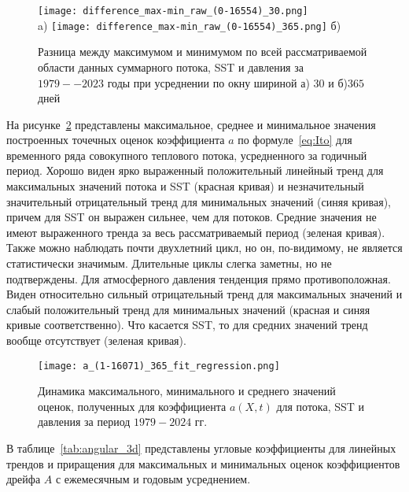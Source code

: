 \begin{figure}
	\centering
	\texttt{[image: difference\_max-min\_raw\_(0-16554)\_30.png]}\\
	a)
	\texttt{[image: difference\_max-min\_raw\_(0-16554)\_365.png]}
	б)
	\caption{Разница между максимумом и минимумом по всей рассматриваемой области данных суммарного потока, SST и давления за $1979--2023$ годы при усреднении по окну шириной а) $30$ и б)$365$ дней}
	\label{fig:raw_trends}
\end{figure}

На рисунке~\ref{fig:a_extreme_365} представлены максимальное, среднее и минимальное значения построенных точечных оценок коэффициента $a$ по формуле~\eqref{eq:Ito} для временного ряда совокупного теплового потока, усредненного за годичный период. Хорошо виден ярко выраженный положительный линейный тренд для максимальных значений потока и SST (красная кривая) и незначительный значительный отрицательный тренд для минимальных значений (синяя кривая), причем для SST он выражен сильнее, чем для потоков. Средние значения не имеют выраженного тренда за весь рассматриваемый период (зеленая кривая). Также можно наблюдать почти двухлетний цикл, но он, по-видимому, не является статистически значимым. Длительные циклы слегка заметны, но не подтверждены. Для атмосферного давления тенденция прямо противоположная. Виден относительно сильный отрицательный тренд для максимальных значений и слабый положительный тренд для минимальных значений (красная и синяя кривые соответственно). Что касается SST, то для средних значений тренд вообще отсутствует (зеленая кривая).


\begin{figure}
	\centering
	\texttt{[image: a\_(1-16071)\_365\_fit\_regression.png]}
	\caption{Динамика максимального, минимального и среднего значений оценок, полученных для коэффициента $a(X,t)$ для потока, SST и давления за период $1979-2024$ гг.} 
	\label{fig:a_extreme_365}
\end{figure}

В таблице~\ref{tab:angular_3d} представлены угловые коэффициенты для линейных трендов и приращения для максимальных и минимальных оценок коэффициентов дрейфа $A$ с ежемесячным и годовым усреднением.

